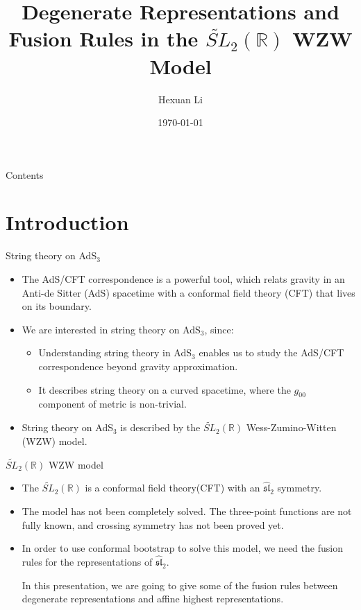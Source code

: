 \documentclass{beamer}
\title[The \texorpdfstring{$\widetilde{SL}_{2}(\mathbb{R})$}{Lg} WZW Model]{Degenerate Representations and Fusion Rules in the $\widetilde{SL}_{2}(\mathbb{R})$ WZW Model}
\author[Hexuan Li]{Hexuan Li}
\institute[École Polytechnique]
{
  
  Advisor: Prof. Sylvain Ribault
}
\date{\today}
\begin{document}
\begin{frame}[plain]
  \titlepage
\end{frame}

\begin{frame}{Contents}
  \tableofcontents
\end{frame}

\section{Introduction}

\begin{frame}{String theory on AdS\texorpdfstring{${}_{3}$}{Lg}}
  \begin{itemize}
    \item The AdS/CFT correspondence is a powerful tool, which relats gravity in an Anti-de Sitter (AdS) spacetime with a conformal field 
    theory (CFT) that lives on its boundary.
    \vspace{0.5cm}
    \item We are interested in string theory on AdS${}_{3}$, since: 
      \begin{itemize}
        \item Understanding string theory in AdS${}_{3}$ enables us to study the AdS/CFT correspondence beyond gravity approximation. 
        \item It describes string theory on a curved spacetime, where the $g_{00}$ component of metric is non-trivial.
      \end{itemize}
    \vspace{0.5cm}
    
    \item String theory on AdS${}_{3}$ is described by the $\widetilde{SL}_{2}(\mathbb{R})$ Wess-Zumino-Witten (WZW) 
    model. 

  \end{itemize}
\end{frame}

\begin{frame}{\texorpdfstring{$\widetilde{SL}_{2}(\mathbb{R})$}{Lg} WZW model}
  \begin{itemize}
    \item The $\widetilde{SL}_{2}(\mathbb{R})$ is a conformal field theory(CFT) with an $\widehat{\mathfrak{sl}}_{2}$ symmetry. 
    \item The model has not been completely solved. The three-point functions are not fully known, and crossing symmetry has not been 
    proved yet.
    \item In order to use conformal bootstrap to solve this model, we need the fusion rules for the representations of 
    $\widehat{\mathfrak{sl}}_{2}$.
    \vspace{1cm}
    \begin{block}{}
      In this presentation, we are going to give some of the fusion rules 
      between degenerate representations and affine highest representations.
    \end{block}
  \end{itemize}
\end{frame}
\end{document}
